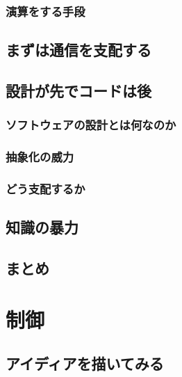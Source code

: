 \documentclass[dvipdfmx]{jsbook}
\begin{document}
\subsection{演算をする手段}


\section{まずは通信を支配する}


\section{設計が先でコードは後}

\subsection{ソフトウェアの設計とは何なのか}

\subsection{抽象化の威力}

\subsection{どう支配するか}


\section{知識の暴力}


\section{まとめ}


\clearpage

\chapter{制御}

\section{アイディアを描いてみる}
\end{document}
